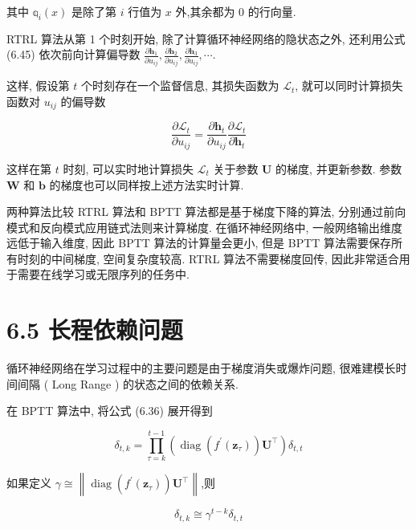 \documentclass[10pt]{article}
\begin{document}
其中 $\mathbb{q}_{i}(x)$ 是除了第 $i$ 行值为 $x$ 外,其余都为 0 的行向量.

RTRL 算法从第 1 个时刻开始, 除了计算循环神经网络的隐状态之外, 还利用公式 (6.45) 依次前向计算偏导数 $\frac{\partial \boldsymbol{h}_{1}}{\partial u_{i j}}, \frac{\partial \boldsymbol{h}_{2}}{\partial u_{i j}}, \frac{\partial \boldsymbol{h}_{3}}{\partial u_{i j}}, \cdots$.

这样, 假设第 $t$ 个时刻存在一个监督信息, 其损失函数为 $\mathcal{L}_{t}$, 就可以同时计算损失函数对 $u_{i j}$ 的偏导数


\begin{equation*}
\frac{\partial \mathcal{L}_{t}}{\partial u_{i j}}=\frac{\partial \boldsymbol{h}_{t}}{\partial u_{i j}} \frac{\partial \mathcal{L}_{t}}{\partial \boldsymbol{h}_{t}} \tag{6.46}
\end{equation*}


这样在第 $t$ 时刻, 可以实时地计算损失 $\mathcal{L}_{t}$ 关于参数 $\boldsymbol{U}$ 的梯度, 并更新参数. 参数 $\boldsymbol{W}$ 和 $\boldsymbol{b}$ 的梯度也可以同样按上述方法实时计算.

两种算法比较 RTRL 算法和 BPTT 算法都是基于梯度下降的算法, 分别通过前向模式和反向模式应用链式法则来计算梯度. 在循环神经网络中, 一般网络输出维度远低于输入维度, 因此 BPTT 算法的计算量会更小, 但是 BPTT 算法需要保存所有时刻的中间梯度, 空间复杂度较高. RTRL 算法不需要梯度回传, 因此非常适合用于需要在线学习或无限序列的任务中.

\section*{6.5 长程依赖问题}
循环神经网络在学习过程中的主要问题是由于梯度消失或爆炸问题, 很难建模长时间间隔 ( Long Range ) 的状态之间的依赖关系.

在 BPTT 算法中, 将公式 (6.36) 展开得到


\begin{equation*}
\delta_{t, k}=\prod_{\tau=k}^{t-1}\left(\operatorname{diag}\left(f^{\prime}\left(\boldsymbol{z}_{\tau}\right)\right) \boldsymbol{U}^{\top}\right) \delta_{t, t} \tag{6.47}
\end{equation*}


如果定义 $\gamma \cong\left\|\operatorname{diag}\left(f^{\prime}\left(\boldsymbol{z}_{\tau}\right)\right) \boldsymbol{U}^{\top}\right\|$,则


\begin{equation*}
\delta_{t, k} \cong \gamma^{t-k} \delta_{t, t} \tag{6.48}
\end{equation*}
\end{document}
